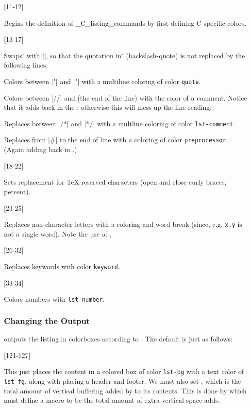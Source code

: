 [11-12]

Begins the definition of \macro\_C_listing_commands{} by first defining C-specific colors.

[13-17]

\benum
    \item Swaps \macro\"{} with \inlinecode|{\"}|, so that the quotation in \macro\"{} (backslash-quote) is
        not replaced by the following lines.
    \item Colors between \inlinecode|"| and \inlinecode|"| with a multiline coloring of color {\tt quote}.
    \item Colors between \inlinecode|//| and \macro\n{} (the end of the line) with the color of a comment.
        Notice that it adds back in the \macro\n; otherwise this will mess up the line-reading.
    \item Replaces between \inlinecode|/*| and \inlinecode|*/| with a multline coloring of color
            {\tt lst-comment}.
    \item Replaces from \inlinecode|#| to the end of line with a coloring of color {\tt preprocessor}.
        (Again adding back in \macro\n.)
\eenum

[18-22]

Sets replacement for \TeX-reserved characters (open and close curly braces, percent).

[23-25]

Replaces non-character letters with a coloring and word break (since, e.g. {\tt x.y} is not a single word).
Note the use of \gotomacro\map.

[26-32]

Replaces keywords with color {\tt keyword}.

[33-34]

Colors numbers with {\tt lst-number}.

\subsubsection{Changing the Output}

\pdftoolbox{} outputs the listing in colorboxes according to \macro\syntaxoutbox.
The default is just as follows:

[121-127]

This just places the content in a colored box of color {\tt lst-bg} with a text color of {\tt lst-fg}, along with placing a header and footer.
We must also set \macro\syntaxoutboxbuf, which is the total amount of vertical buffering added by
\macro\syntaxoutbox{} to its contents.
This is done by \macro\syntaxoutboxsetbuf{} which must define a macro \macro\syntaxoutboxbuf{} to be the total amount of extra vertical space \macro\syntaxoutbox{} adds.

